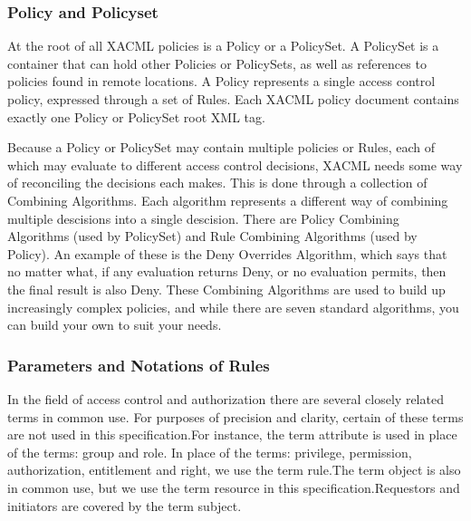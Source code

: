 \subsubsection{Policy and Policyset}
\hspace{5mm}At the root of all XACML policies is a Policy or a PolicySet. A PolicySet is a container that can hold other Policies or PolicySets, as well as references to policies found in remote locations. A Policy represents a single access control policy, expressed through a set of Rules. Each XACML policy document contains exactly one Policy or PolicySet root XML tag. 
\par Because a Policy or PolicySet may contain multiple policies or Rules, each of which may evaluate to different access control decisions, XACML needs some way of reconciling the decisions each makes. This is done through a collection of Combining Algorithms. Each algorithm represents a different way of combining multiple descisions into a single descision. There are Policy Combining Algorithms (used by PolicySet) and Rule Combining Algorithms (used by Policy). An example of these is the Deny Overrides Algorithm, which says that no matter what, if any evaluation returns Deny, or no evaluation permits, then the final result is also Deny. These Combining Algorithms are used to build up increasingly complex policies, and while there are seven standard algorithms, you can build your own to suit your needs.

\subsubsection{Parameters and Notations of Rules}
\hspace{5mm} In the field of access control and authorization there are several closely related terms in common use. For purposes of precision and clarity, certain of these terms are not used in this specification.For instance, the term attribute is used in place of the terms: group and role.
In place of the terms: privilege, permission, authorization, entitlement and right, we use the term rule.The term object is also in common use, but we use the term resource in this specification.Requestors and initiators are covered by the term subject.

